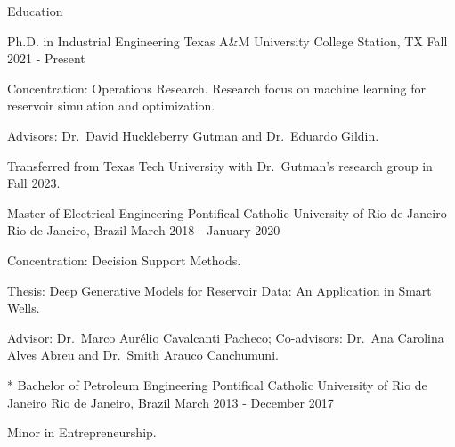 \begin{cvcontentsection}{Education}

\begin{cvjob}
    {Ph.D. in Industrial Engineering}
    {Texas A\&M University}
    {College Station, TX}
    {Fall 2021 - Present}
    \item Concentration: Operations Research.
    Research focus on machine learning for reservoir simulation and optimization.
    \item Advisors: Dr.\ David Huckleberry Gutman and Dr.\ Eduardo Gildin.
    \item Transferred from Texas Tech University with Dr.\ Gutman's research group in Fall 2023.
\end{cvjob}

\begin{cvjob}
    {Master of Electrical Engineering}
    {Pontifical Catholic University of Rio de Janeiro}
    {Rio de Janeiro, Brazil}
    {March 2018 - January 2020}
    \item Concentration: Decision Support Methods.
    \item Thesis: Deep Generative Models for Reservoir Data: An Application in Smart Wells.
    \item Advisor: Dr.\ Marco Aurélio Cavalcanti Pacheco;
    Co-advisors: Dr.\ Ana Carolina Alves Abreu and Dr.\ Smith Arauco Canchumuni.
\end{cvjob}

\begin{cvjob}*
    {Bachelor of Petroleum Engineering}
    {Pontifical Catholic University of Rio de Janeiro}
    {Rio de Janeiro, Brazil}
    {March 2013 - December 2017}
    \item Minor in Entrepreneurship.
\end{cvjob}

\end{cvcontentsection}
